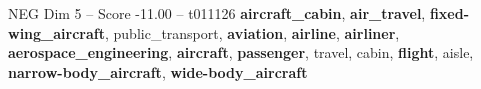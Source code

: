 \begin{textsample}{NEG Dim 5 – Score -11.00 – t011126}  \label{ex:f5_neg_038}
\textbf{aircraft\_cabin}, \textbf{air\_travel}, \textbf{fixed-wing\_aircraft}, public\_transport, \textbf{aviation}, \textbf{airline}, \textbf{airliner}, \textbf{aerospace\_engineering}, \textbf{aircraft}, \textbf{passenger}, travel, cabin, \textbf{flight}, aisle, \textbf{narrow-body\_aircraft}, \textbf{wide-body\_aircraft}

\end{textsample}

